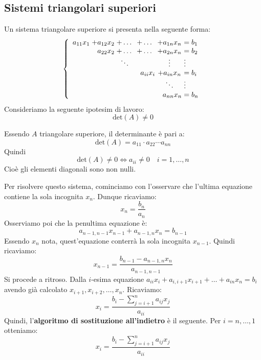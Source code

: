 \documentclass[12pt]{report}
\begin{document}
\subsection{Sistemi triangolari superiori}
Un sistema triangolare superiore si presenta nella seguente forma:
\[
\left\{
\begin{array}{r@{\mskip\thickmuskip}c@{\mskip\thickmuskip}c@{\mskip\thickmuskip}c@{\mskip\thickmuskip}c@{\mskip\thickmuskip}l}
a_{11}x_1 & + a_{12}x_2 & + \dots & + \dots & + a_{1n}x_n & = b_1 \\
          & \phantom{+}a_{22}x_2   & + \dots & + \dots & + a_{2n}x_n & = b_2 \\
          &             & \ddots  &         & \vdots      & \vdots \\
          &             &         & \phantom{+}a_{ii}x_i & + a_{in}x_n & = b_i \\
          &             &         &           & \ddots      & \vdots \\
          &             &         &           &\phantom{+} a_{nn}x_n   & = b_n
\end{array}
\right.
\]
Consideriamo la seguente ipotesim di lavoro:
\[
\text{det}(A) \neq 0
\]
\begin{note}{}{}
Essendo $A$ triangolare superiore, il determinante è pari a:
\[
\text{det}(A) = a_{11} \cdot a_{22} \cdots a_{nn}
\]
Quindi
\[
\text{det}(A) \neq 0 \iff a_{ii} \neq 0 \quad i = 1, \dots, n
\]
Cioè gli elementi diagonali sono non nulli.
\end{note}
Per risolvere questo sistema, cominciamo con l'osservare che l'ultima equazione contiene la sola incognita $x_n$. Dunque ricaviamo:
\[
x_n = \frac{b_n}{a_n}
\]
Osserviamo poi che la penultima equazione è:
\[
a_{n-1, n-1}x_{n-1} + a_{n-1,n}x_n = b_{n-1}
\]
Essendo $x_n$ nota, quest'equazione conterrà la sola incognita $x_{n-1}$. Quindi ricaviamo:
\[
x_{n-1} = \frac{b_{n-1} - a_{n-1, n}x_n}{a_{n-1, n-1}}
\]
Si procede a ritroso. Dalla $i$-esima equazione $a_{ii}x_i + a_{i, i+1}x_{i+1} + \dots + a_{in}x_n = b_i$ avendo già calcolato  $x_{i+1}, x_{i+2}, \dots, x_n$. Ricaviamo:
\[
x_i = \frac{b_i - \displaystyle\sum_{j=i+1}^{n}a_{ij}x_j}{a_{ii}}
\]
Quindi, l'\textbf{algoritmo di sostituzione all'indietro} è il seguente. Per $i = n, \dots, 1$ otteniamo:
\[
x_i = \frac{b_i - \displaystyle\sum_{j=i+1}^{n}a_{ij}x_j}{a_{ii}}
\]
\end{document}

